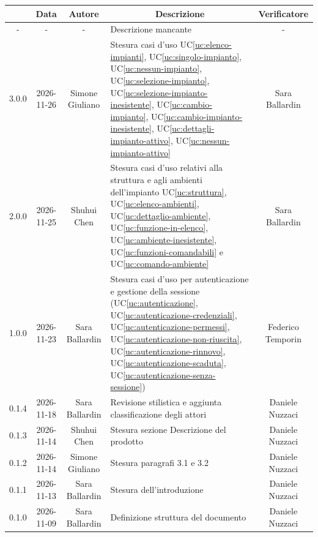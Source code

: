 \documentclass[11pt, a4paper]{article}
\newcounter{uc}                            %
\newcommand{\ucref}[1]{UC\ref{uc:#1}}
\begin{document}
\begin{center}
    \renewcommand{\arraystretch}{1.5}
    \begin{tabularx}{\textwidth}{|c|c|c|X|c|}
        \hline
        \rowcolor{gray!10} 
        \multicolumn{1}{|c|}{\textbf{Versione}} & 
        \multicolumn{1}{c|}{\textbf{Data}} & 
        \multicolumn{1}{c|}{\textbf{Autore}} & 
        \multicolumn{1}{c|}{\textbf{Descrizione}} & 
        \multicolumn{1}{c|}{\textbf{Verificatore}} \\
        \hline
        - & - & - & Descrizione mancante & - \\
        \hline
        3.0.0 & 2026-11-26 & Simone Giuliano & Stesura casi d'uso \ucref{elenco-impianti}, \ucref{singolo-impianto}, \ucref{nessun-impianto}, \ucref{selezione-impianto}, \ucref{selezione-impianto-inesistente}, \ucref{cambio-impianto}, \ucref{cambio-impianto-inesistente}, \ucref{dettagli-impianto-attivo}, \ucref{nessun-impianto-attivo} & Sara Ballardin \\ 
        \hline
        2.0.0 & 2026-11-25 & Shuhui Chen & Stesura casi d'uso relativi alla struttura e agli ambienti dell'impianto \ucref{struttura}, \ucref{elenco-ambienti}, \ucref{dettaglio-ambiente}, \ucref{funzione-in-elenco}, \ucref{ambiente-inesistente}, \ucref{funzioni-comandabili} e \ucref{comando-ambiente} &  Sara Ballardin \\ 
        \hline
        1.0.0 & 2026-11-23 & Sara Ballardin & Stesura casi d'uso per autenticazione e gestione della sessione (\ucref{autenticazione}, \ucref{autenticazione-credenziali}, \ucref{autenticazione-permessi}, \ucref{autenticazione-non-riuscita}, \ucref{autenticazione-rinnovo}, \ucref{autenticazione-scaduta}, \ucref{autenticazione-senza-sessione})  & Federico Temporin \\
        \hline
        0.1.4 & 2026-11-18 & Sara Ballardin & Revisione stilistica e aggiunta classificazione degli attori & Daniele Nuzzaci \\ %
        \hline
        0.1.3 & 2026-11-14 & Shuhui Chen & Stesura sezione Descrizione del prodotto & Daniele Nuzzaci \\
        \hline
        0.1.2 & 2026-11-14 & Simone Giuliano & Stesura paragrafi 3.1 e 3.2 & Daniele Nuzzaci \\
        \hline
        0.1.1 & 2026-11-13 & Sara Ballardin & Stesura dell'introduzione & Daniele Nuzzaci \\
        \hline
        0.1.0 & 2026-11-09 & Sara Ballardin & Definizione struttura del documento & Daniele Nuzzaci \\
        \hline
    \end{tabularx}
\end{center}
\vfill
\newpage
\end{document}
